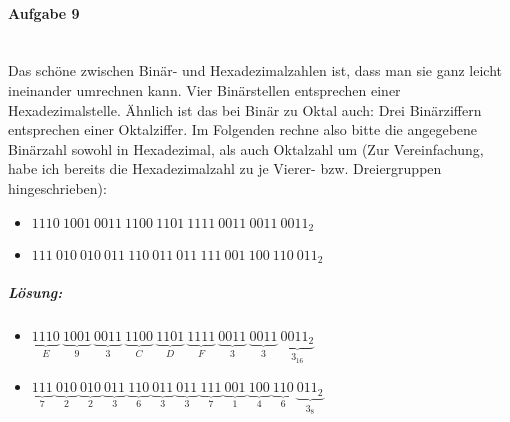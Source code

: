 \documentclass[12pt,a4paper,ngerman]{scrartcl}
\begin{document}
	\paragraph{Aufgabe 9}\mbox{}\\
	Das schöne zwischen Binär- und Hexadezimalzahlen ist, dass man sie ganz leicht ineinander umrechnen kann. Vier Binärstellen entsprechen einer Hexadezimalstelle. Ähnlich ist das bei Binär zu Oktal auch: Drei Binärziffern entsprechen einer Oktalziffer. Im Folgenden rechne also bitte die angegebene Binärzahl sowohl in Hexadezimal, als auch Oktalzahl um (Zur Vereinfachung, habe ich bereits die Hexadezimalzahl zu je Vierer- bzw. Dreiergruppen hingeschrieben):
	\begin{itemize}
		\item[] $1110\ 1001\ 0011\ 1100\ 1101\ 1111\ 0011\ 0011\ 0011_{2}$
		\item[] $111\ 010\ 010\ 011\ 110\ 011\ 011\ 111\ 001\ 100\ 110\ 011_{2}$
	\end{itemize}

	\subparagraph{Lösung:} 
	\begin{itemize}
		\item[] $\underbrace{1110}_{E}\ 
		\underbrace{1001}_{9}\ 
		\underbrace{0011}_{3}\ 
		\underbrace{1100}_{C}\ 
		\underbrace{1101}_{D}\ 
		\underbrace{1111}_{F}\ 
		\underbrace{0011}_{3}\ 
		\underbrace{0011}_{3}\ 
		\underbrace{0011_{2}}_{3_{16}}$
		\item[] $\underbrace{111}_{7}\ 
		\underbrace{010}_{2}\ 
		\underbrace{010}_{2}\ 
		\underbrace{011}_{3}\ 
		\underbrace{110}_{6}\ 
		\underbrace{011}_{3}\ 
		\underbrace{011}_{3}\ 
		\underbrace{111}_{7}\ 
		\underbrace{001}_{1}\ 
		\underbrace{100}_{4}\ 
		\underbrace{110}_{6}\ 
		\underbrace{011_{2}}_{3_8}$
	\end{itemize}
\end{document}
